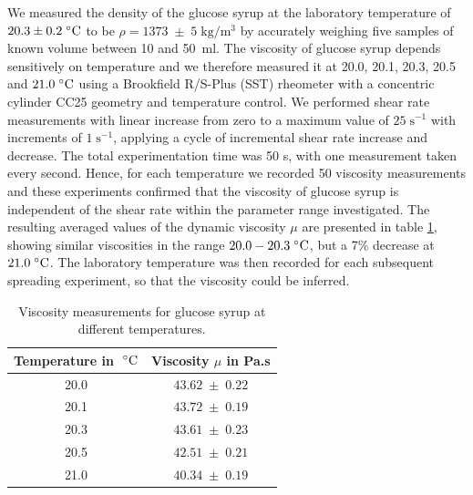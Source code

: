 \documentclass[aip,graphicx]{revtex4-1}
\newcommand{\sym}[1]{\text{#1}} \newcommand{\dif}{\mathrm{d}}
\begin{document}
We measured the density of the glucose syrup at the laboratory temperature
of $20.3 \pm 0.2 \; ^{\circ} \text{C}$ to be $\rho=1373 \; \pm \; 5 \;
\sym{kg}/\sym{m}^3$ by accurately weighing five samples of known
volume between 10 and 50~ml.  The viscosity of glucose syrup depends
sensitively on temperature \cite{llewellin2002rheology} and we
therefore measured it at 20.0, 20.1, 20.3, 20.5 and $21.0 \; ^{\circ} \text{C}$
using a Brookfield R/S-Plus (SST) rheometer with a concentric cylinder
CC25 geometry and temperature control. We performed shear rate
measurements with linear increase from zero to a maximum value of $25
\; \sym{s}^{-1}$ with increments of $1 \; \sym{s}^{-1}$, applying a
cycle of incremental shear rate increase and decrease.  The total
experimentation time was 50 s, with one measurement taken every
second. Hence, for each temperature we recorded 50 viscosity
measurements and these experiments confirmed that the viscosity of
glucose syrup is independent of the shear rate 
within the parameter range investigated. The resulting
averaged values of the dynamic viscosity $\mu$ are presented in table
\ref{tab:glucose_viscosity}, showing similar viscosities in the range
$20.0 - 20.3 \; ^{\circ} \text{C}$, but a 7\% decrease at $21.0 \; ^{\circ} \text{C}$. The
laboratory temperature was then recorded for each subsequent 
spreading experiment, so that the viscosity could be inferred. 


{\renewcommand{\arraystretch}{1.2}
 \begin{table}[!ht]
 \begin{center}
 \begin{tabular}{c | c}
  Temperature in $\; ^{\circ} \text{C}$ & Viscosity $\mu$ in Pa.s \\ \hline 20.0 &
  $43.62 \; \pm \; 0.22$ \\ 20.1 & $43.72 \; \pm \; 0.19$ \\ 20.3 &
  $43.61 \; \pm \; 0.23$ \\ 20.5 & $42.51 \; \pm \; 0.21$ \\ 21.0 &
  $40.34 \; \pm \; 0.19$\\
 \end{tabular}
 \caption{Viscosity measurements for glucose syrup at different
   temperatures.}
 \label{tab:glucose_viscosity}
 \end{center}
 \end{table}}
\end{document}
